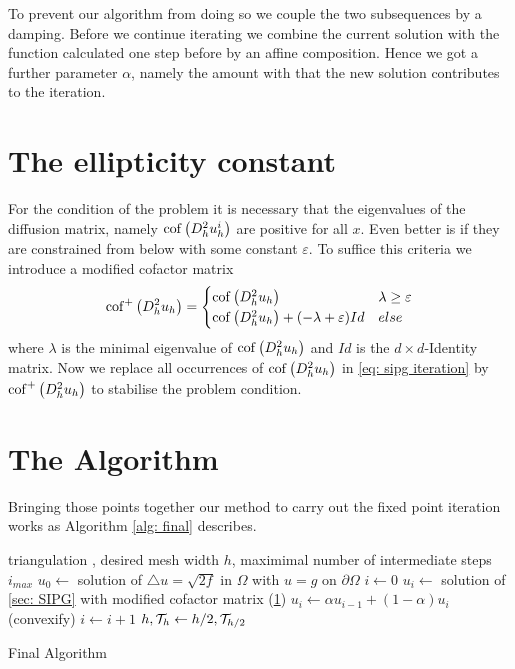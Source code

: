 To prevent our algorithm from doing so we couple the two subsequences by a damping. Before we continue iterating we combine the current solution with the function calculated one step before by an affine composition. Hence we got a further parameter $\alpha$, namely the amount with that the new solution contributes to the iteration.

\section{The ellipticity constant}\label{sec: mod cofactor}
For the condition of the problem it is necessary that the eigenvalues of the diffusion matrix, namely $\operatorname{cof} \left( D_h^2 u_h^i \right)$ are positive for all $x$. Even better is if they are constrained from below with some constant $\varepsilon$. 
To suffice this criteria we introduce a modified cofactor matrix
\[ 
	\mycofMod {D^2_h u_h} = \begin{cases}
	\mycof {D^2_h u_h} & \lambda \geq \varepsilon	\\
	\mycof {D^2_h u_h}+ (-\lambda+\varepsilon) Id%
	& else
	\end{cases}
\]
where $\lambda$ is the minimal eigenvalue of $ \operatorname{cof} \left( D^2_h u_h \right)$ and $Id$ is the $d \times d$-Identity matrix. Now we replace all occurrences of $\operatorname{cof} \left( D^2_h u_h \right)$ in \eqref{eq: sipg iteration} by $\operatorname{cof}^+ \left( D^2_h u_h \right)$ to stabilise the problem condition.

\section{The Algorithm}

Bringing those points together our method to carry out the fixed point iteration works as Algorithm \ref{alg: final} describes.

\begin{algorithm}
\begin{algorithmic}
\Require triangulation \triang, desired mesh width $h$, maximimal number of intermediate steps $i_{max}$
\State $u_0\gets $ solution of  $
	\triangle u = \sqrt{2f} \text{ in } \Omega $ with $
	u = g \text{ on }\partial \Omega$
	\State $i \gets 0$
		\State $u_i \gets$ solution of \ref{sec: SIPG} with modified cofactor matrix (\ref{sec: mod cofactor})
		\State $u_i \gets \alpha u_{i-1} + (1-\alpha)u_i $
		\State (convexify)
		\State $i \gets i+1$
	\EndWhile
	\State $h, \mathcal{T}_h \gets h/2, \mathcal{T}_{h/2}$
\EndWhile
\end{algorithmic}
\caption{Final Algorithm}
\label{alg: final}
\end{algorithm}


